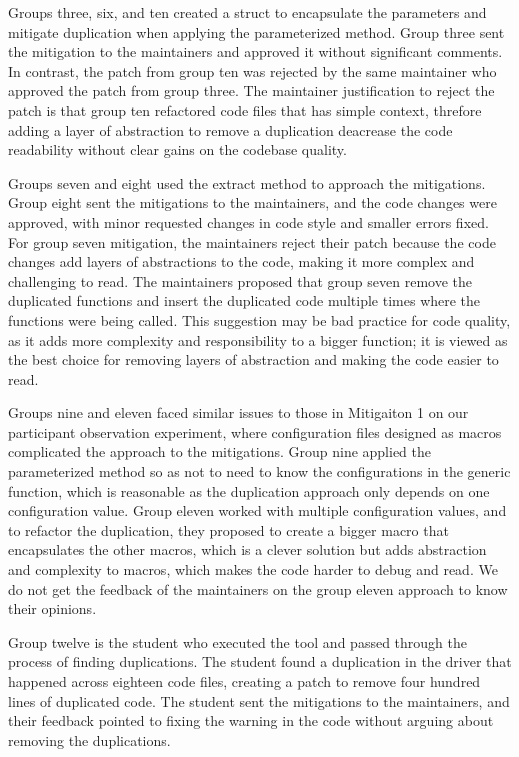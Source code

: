 Groups three, six, and ten created a struct to encapsulate the parameters and mitigate duplication 
when applying the parameterized method. Group three sent the mitigation to the maintainers and 
approved it without significant comments. In contrast, the patch from group ten was rejected by 
the same maintainer who approved the patch from group three. The maintainer justification to reject 
the patch is that group ten refactored code files that has simple context, threfore adding a layer 
of abstraction to remove a duplication deacrease the code readability without clear gains on 
the codebase quality.

Groups seven and eight used the extract method to approach the mitigations. Group eight sent the 
mitigations to the maintainers, and the code changes were approved, with minor requested changes 
in code style and smaller errors fixed. For group seven mitigation, the maintainers reject their 
patch because the code changes add layers of abstractions to the code, making it more complex and 
challenging to read. The maintainers proposed that group seven remove the duplicated functions and 
insert the duplicated code multiple times where the functions were being called. This suggestion 
may be bad practice for code quality, as it adds more complexity and responsibility to a bigger 
function; it is viewed as the best choice for removing layers of abstraction and making the 
code easier to read.

Groups nine and eleven faced similar issues to those in Mitigaiton 1 on our participant observation 
experiment, where configuration files designed as macros complicated the approach to the mitigations. 
Group nine applied the parameterized method so as not to need to know the configurations in the 
generic function, which is reasonable as the duplication approach only depends on one configuration 
value. Group eleven worked with multiple configuration values, and to refactor the duplication, 
they proposed to create a bigger macro that encapsulates the other macros, which is a clever 
solution but adds abstraction and complexity to macros, which makes the code harder to debug and read.
We do not get the feedback of the maintainers on the group eleven approach to know their opinions.

Group twelve is the student who executed the tool and passed through the process of finding 
duplications. The student found a duplication in the driver that happened across eighteen code files, 
creating a patch to remove four hundred lines of duplicated code. The student sent the mitigations 
to the maintainers, and their feedback pointed to fixing the warning in the code without arguing 
about removing the duplications.

